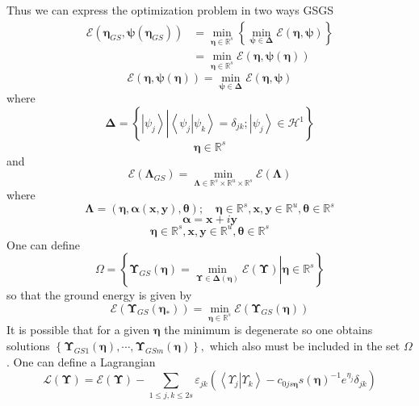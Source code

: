 \documentclass[aps,preprint]{revtex4}%
\begin{document}
Thus we can express the optimization problem in two ways GSGS
\begin{align*}
\mathcal{E}\left(  \mathbf{\eta}_{GS},\mathbf{\psi}\left(  \mathbf{\eta}%
_{GS}\right)  \right)   &  =\min_{\mathbf{\eta\in}\mathbb{R}^{s}}\left\{
\min_{\mathbf{\psi\in\Delta}}\mathcal{E}\left(  \mathbf{\eta,\psi}\right)
\right\} \\
&  =\min_{\mathbf{\eta\in}\mathbb{R}^{s}}\mathcal{E}\left(  \mathbf{\eta,\psi
}\left(  \mathbf{\eta}\right)  \right)
\end{align*}%
\[
\mathcal{E}\left(  \mathbf{\eta,\psi}\left(  \mathbf{\eta}\right)  \right)
=\min_{\mathbf{\psi\in\Delta}}\mathcal{E}\left(  \mathbf{\eta,\psi}\right)
\]
where
\[
\mathbf{\Delta}=\left\{  \left\vert \psi_{j}\right\rangle \left\vert
\overset{}{\left\langle \left.  \psi_{j}\right\vert \psi_{k}\right\rangle
=\delta_{jk};\left\vert \psi_{j}\right\rangle \in\mathcal{H}^{1}}\right.
\right\}
\]%
\[
\mathbf{\eta\in}\mathbb{R}^{s}%
\]
and
\[
\mathcal{E}\left(  \mathbf{\Lambda}_{GS}\right)  =\min_{\mathbf{\Lambda\in
}\mathbb{R}^{s}\times\mathbb{R}^{u}\times\mathbb{R}^{s}}\mathcal{E}\left(
\mathbf{\Lambda}\right)
\]
where
\[
\mathbf{\Lambda}=\left(  \mathbf{\eta,\alpha}\left(  \mathbf{x,y}\right)
,\mathbf{\theta}\right)  ;\quad\mathbf{\eta\in}\mathbb{R}^{s},\mathbf{x,y\in
}\mathbb{R}^{u},\mathbf{\theta\in}\mathbb{R}^{s}%
\]%
\[
\mathbf{\alpha}=\mathbf{x}+i\mathbf{y}%
\]%
\[
\mathbf{\eta\in}\mathbb{R}^{s},\mathbf{x,y\in}\mathbb{R}^{u},\mathbf{\theta
\in}\mathbb{R}^{s}%
\]
One can define
\[
\Omega=\left\{  \left.  \mathbf{\Upsilon}_{GS}\left(  \mathbf{\eta}\right)
=\min_{\mathbf{\Upsilon\in\Delta}\left(  \mathbf{\eta}\right)  }%
\mathcal{E}\left(  \mathbf{\Upsilon}\right)  \right\vert \mathbf{\eta\in
}\mathbb{R}^{s}\right\}
\]
so that the ground energy is given by
\[
\mathcal{E}\left(  \mathbf{\Upsilon}_{GS}\left(  \mathbf{\eta}_{\ast}\right)
\right)  =\min_{\mathbf{\eta\in}\mathbb{R}^{s}}\mathcal{E}\left(
\mathbf{\Upsilon}_{GS}\left(  \mathbf{\eta}\right)  \right)
\]
It is possible that for a given $\mathbf{\eta}$ the minimum is degenerate so
one obtains solutions $\left\{  \mathbf{\Upsilon}_{GS1}\left(  \mathbf{\eta
}\right)  ,\cdots,\mathbf{\Upsilon}_{GSm}\left(  \mathbf{\eta}\right)
\right\}  ,$ which also must be included in the set $\Omega$. One can define a
Lagrangian
\[
\mathcal{L}\left(  \mathbf{\Upsilon}\right)  =\mathcal{E}\left(
\mathbf{\Upsilon}\right)  -\sum_{1\leq j,k\leq2s}\varepsilon_{jk}\left(
\left\langle \left.  \Upsilon_{j}\right\vert \Upsilon_{k}\right\rangle
-c_{0j\mathit{s}\mathbf{\eta}}\mathit{s}\left(  \mathbf{\eta}\right)
^{-1}e^{\eta_{j}}\delta_{jk}\right)
\]
\end{document}
